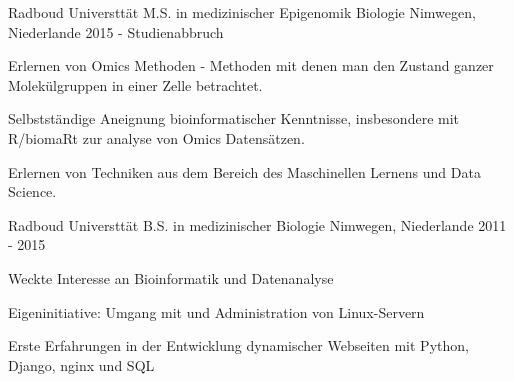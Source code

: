 \begin{cventries}
  \cventry
  {Radboud Universttät} %
  {M.S. in medizinischer Epigenomik Biologie} %
  {Nimwegen, Niederlande} %
  {2015 - Studienabbruch} %
  {
    \begin{cvitems} %
      \item {Erlernen von Omics Methoden - Methoden mit denen man den Zustand ganzer Molekülgruppen in einer Zelle betrachtet.}
      \item {Selbstständige Aneignung bioinformatischer Kenntnisse, insbesondere mit R/biomaRt zur analyse von Omics Datensätzen.}
      \item {Erlernen von Techniken aus dem Bereich des Maschinellen Lernens und Data Science.}
    \end{cvitems}
  }

  \cventry
  {Radboud Universttät} %
  {B.S. in medizinischer Biologie} %
  {Nimwegen, Niederlande} %
  {2011 - 2015} %
  {
    \begin{cvitems} %
      \item {Weckte Interesse an Bioinformatik und Datenanalyse}
      \item {Eigeninitiative: Umgang mit und Administration von Linux-Servern}
      \item {Erste Erfahrungen in der Entwicklung dynamischer Webseiten mit Python, Django, nginx und SQL}
    \end{cvitems}
  }

\end{cventries}
